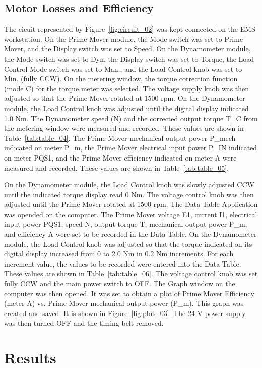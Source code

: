 \documentclass{article}
\begin{document}
\subsection{Motor Losses and Efficiency}
\label{part3} The cicuit represented by Figure~\ref{fig:circuit_02} was kept connected on the EMS workstation.
On the Prime Mover module, the Mode switch was set to Prime Mover, and the Display switch was set to Speed. On
the Dynamometer module, the Mode switch was set to Dyn, the Display switch was set to Torque, the Load Control 
Mode switch was set to Man., and the Load Control knob was set to Min. (fully CCW). On the metering window, the 
torque correction function (mode C) for the torque meter was selected. The voltage supply knob was then adjusted 
so that the Prime Mover rotated at 1500 rpm. On the Dynamometer module, the Load Control knob was adjusted until
the digital display indicated 1.0 Nm. The Dynamometer speed (N) and the corrected output torque T_C from the 
metering window were measured and recorded. These values are shown in Table~\ref{tab:table_04}. The Prime Mover
mechanical output power P_{mech} indicated on meter P_{m}, the Prime Mover electrical input power P_{IN} indicated
on meter PQS1, and the Prime Mover efficiency \eta indicated on meter A were measured and recorded. These values are 
shown in Table~\ref{tab:table_05}. 

On the Dynamometer module, the Load Control knob was slowly adjusted CCW until the indicated torque display read
0 Nm. The voltage control knob was then adjusted until the Prime Mover rotated at 1500 rpm. The Data Table Application
was opended on the computer. The Prime Mover voltage E1, current I1, electrical input power PQS1, speed N, output 
torque T, mechanical output power P_{m}, and efficiency A were set to be recorded in the Data Table. On the Dynamometer
module, the Load Control knob was adjusted so that the torque indicated on its digital display increased from 0 to 
2.0 Nm in 0.2 Nm increments. For each increment value, the values to be recorded were entered into the Data Table.
These values are shown in Table~\ref{tab:table_06}. The voltage control knob was set fully CCW and the main power
switch to OFF. The Graph window on the computer was then opened. It was set to obtain a plot of Prime Mover 
Efficiency (meter A) vs. Prime Mover mechanical output power (P_{m}). This graph was created and saved. It is shown
in Figure~\ref{fig:plot_03}. The 24-V power supply was then turned OFF and the timing belt removed.

\section{Results}
\end{document}
